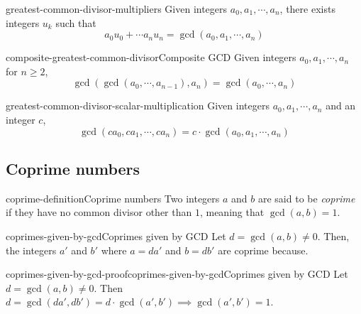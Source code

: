 \documentclass[preview]{standalone}
\begin{document}
\begin{snippetproposition}{greatest-common-divisor-multipliers}{}
Given integers \(a_0, a_1, \cdots, a_n\), there exists integers \(u_k\) such that
\[
    a_0u_0 + \cdots a_n u_n = \gcd(a_0, a_1, \cdots, a_n)
\]
\end{snippetproposition}

\begin{snippetproposition}{composite-greatest-common-divisor}{Composite GCD}
Given integers \(a_0, a_1, \cdots, a_n\)
for \(n \geq 2\), \[\gcd(\gcd(a_0, \cdots, a_{n-1}), a_n) = \gcd(a_0, \cdots, a_n)\]
\end{snippetproposition}

\begin{snippetproposition}{greatest-common-divisor-scalar-multiplication}{}
    Given integers \(a_0, a_1, \cdots, a_n\) and  an integer \(c\),
    \[\gcd(ca_0, ca_1, \cdots, ca_n) = c \cdot \gcd(a_0, a_1, \cdots, a_n)\]
\end{snippetproposition}


\subsection{Coprime numbers}

\begin{snippetdefinition}{coprime-definition}{Coprime numbers}
    Two integers \(a\) and \(b\) are said to be \textit{coprime}
    if they have no common divisor other than \(1\), meaning that \(\gcd(a,b)=1\).
\end{snippetdefinition}

\begin{snippetproposition}{coprimes-given-by-gcd}{Coprimes given by GCD}
    Let \(d = \gcd(a, b) \neq 0\). Then, the integers \(a'\) and \(b'\) where \(a = da'\) and \(b = db'\)
    are coprime because.
\end{snippetproposition}

\begin{snippetproof}{coprimes-given-by-gcd-proof}{coprimes-given-by-gcd}{Coprimes given by GCD}
    Let \(d = \gcd(a, b) \neq 0\). Then \(d = \gcd(da', db') = d\cdot \gcd(a', b') \implies \gcd(a', b') = 1\).
\end{snippetproof}

\end{document}
